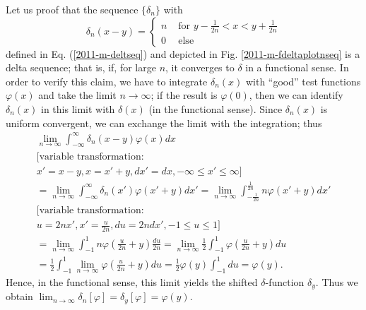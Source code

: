 {
\color{blue}
\bexample
Let us proof that the sequence $\{ \delta_n\}$ with
$$\delta_n(x-y) =
\left\{
\begin{array}{rl}
n & \textrm{ for } y - \frac{1}{2n}  < x < y+ \frac{1}{2n} \\
0& \textrm{ else }
\end{array}
\right.$$
defined in Eq. (\ref{2011-m-deltseq}) and depicted
in Fig.
\ref{2011-m-fdeltaplotnseq}
is a delta sequence;
that is, if, for large $n$, it converges to $\delta$ in a functional sense.
In order to verify this claim, we have to integrate $\delta_n(x)$
with ``good'' test functions $ \varphi (x)$ and take the limit $n\rightarrow \infty$;
if the result is $ \varphi (0)$, then we can identify $\delta_n(x)$ in this limit with $\delta (x)$
(in the functional sense).
Since $\delta_n(x)$ is uniform convergent, we can exchange the limit with the integration; thus
\begin{equation}
\begin{split}
\lim_{n\rightarrow \infty} \int_{-\infty}^\infty \delta_n(x-y) \varphi (x) dx \\
 \textrm{[variable transformation:}  \\
  x'=x-y, x= x'+y, dx' =  dx, -\infty\le x' \le \infty \textrm{]} \\
 =
\lim_{n\rightarrow \infty} \int_{-\infty}^\infty \delta_n(x') \varphi (x'+y) dx'
 =
\lim_{n\rightarrow \infty} \int_{- \frac{1}{2n}}^\frac{1}{2n} n \varphi (x'+y) dx'    \\
 \textrm{[variable transformation:}  \\
  u=2nx', x'=\frac{u}{2n},
   du = 2n dx', -1\le u \le 1\textrm{]} \\
 = \lim_{n\rightarrow \infty} \int_{- 1}^1 n \varphi (\frac{ u}{2n}+y) \frac{du}{2n}
 =
\lim_{n\rightarrow \infty} \frac{1}{2} \int_{- 1}^1 \varphi (\frac{ u}{2n}+y) du     \\
 =
\frac{1}{2} \int_{- 1}^1 \lim_{n\rightarrow \infty} \varphi (\frac{ u}{2n}+y) du
  =
\frac{1}{2} \varphi (y) \int_{- 1}^1  du
  =
\varphi (y)
.
\end{split}
\end{equation}
Hence, in the functional sense,
this limit yields the shifted $\delta$-function $\delta_y$.
Thus we obtain
$
\lim_{n\rightarrow \infty} \delta_n[\varphi] = \delta_y [\varphi] = \varphi (y)
$.
\eexample
}


